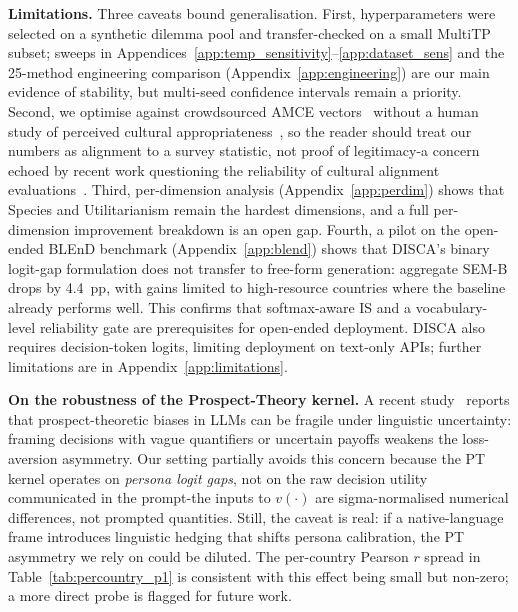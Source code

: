 \documentclass{article}
\begin{document}
\textbf{Limitations.}
Three caveats bound generalisation. First, hyperparameters were selected on a synthetic dilemma pool and transfer-checked on a small MultiTP subset; sweeps in Appendices~\ref{app:temp_sensitivity}--\ref{app:dataset_sens} and the 25-method engineering comparison (Appendix~\ref{app:engineering}) are our main evidence of stability, but multi-seed confidence intervals remain a priority. Second, we optimise against crowdsourced AMCE vectors~\citep{awad2018moral,jin2025multitp} without a human study of perceived cultural appropriateness~\citep{atari2023humans}, so the reader should treat our numbers as alignment to a survey statistic, not proof of legitimacy-a concern echoed by recent work questioning the reliability of cultural alignment evaluations~\citep{cao2025randomness}. Third, per-dimension analysis (Appendix~\ref{app:perdim}) shows that Species and Utilitarianism remain the hardest dimensions, and a full per-dimension improvement breakdown is an open gap. Fourth, a pilot on the open-ended BLEnD benchmark (Appendix~\ref{app:blend}) shows that DISCA's binary logit-gap formulation does not transfer to free-form generation: aggregate SEM-B drops by 4.4~pp, with gains limited to high-resource countries where the baseline already performs well. This confirms that softmax-aware IS and a vocabulary-level reliability gate are prerequisites for open-ended deployment. DISCA also requires decision-token logits, limiting deployment on text-only APIs; further limitations are in Appendix~\ref{app:limitations}.

\textbf{On the robustness of the Prospect-Theory kernel.}
A recent study~\citep{kumar2025pt} reports that prospect-theoretic biases in
LLMs can be fragile under linguistic uncertainty: framing decisions with
vague quantifiers or uncertain payoffs weakens the loss-aversion asymmetry.
Our setting partially avoids this concern because the PT kernel operates on
\emph{persona logit gaps}, not on the raw decision utility communicated in
the prompt-the inputs to $v(\cdot)$ are sigma-normalised numerical
differences, not prompted quantities. Still, the caveat is real: if a
native-language frame introduces linguistic hedging that shifts persona
calibration, the PT asymmetry we rely on could be diluted. The per-country
Pearson $r$ spread in Table~\ref{tab:percountry_p1} is consistent with this
effect being small but non-zero; a more direct probe is flagged for future
work.
\end{document}
